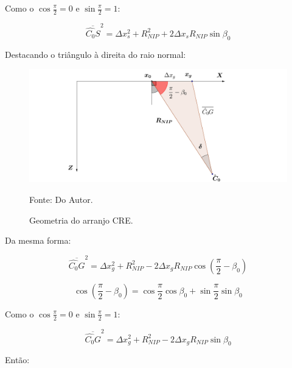 \documentclass[a4paper, 12pt]{article}
\begin{document}
Como o $\cos{\frac{\pi}{2}}=0$ e $\sin{\frac{\pi}{2}}=1$:

\begin{equation}
 \label{eq:1.12}
 \overline{\hat{C_0}S}^2 = \Delta x_{s}^2 + R_{NIP}^2 + 2 \Delta x_s R_{NIP} \sin{\beta_0}
\end{equation}

Destacando o triângulo à direita do raio normal:

\begin{figure}[H]
\caption{Geometria do arranjo CRE.}
\begin{center}
\includegraphics[scale=0.5]{images/Esq.png}
\vspace{-0.3cm}
\end{center}
\begin{center}
 Fonte: Do Autor.
\end{center}
\label{fig:1.5}
\end{figure}

Da mesma forma:

\begin{equation}
 \label{eq:1.13}
 \overline{\hat{C_0}G}^2 = \Delta x_{g}^2 + R_{NIP}^2 - 2 \Delta x_g R_{NIP} 
 \cos{ \left( \frac{\pi}{2} - \beta_0 \right) }
\end{equation}

\begin{equation}
 \label{eq:1.14}
 \cos{\left( \frac{\pi}{2} - \beta_0 \right)} 
 = \cos{\frac{\pi}{2}} \cos{\beta_0} + \sin{\frac{\pi}{2}} \sin{\beta_0}
\end{equation}

Como o $\cos{\frac{\pi}{2}}=0$ e $\sin{\frac{\pi}{2}}=1$:

\begin{equation}
 \label{eq:1.15}
 \overline{\hat{C_0}G}^2 = \Delta x_{g}^2 + R_{NIP}^2 - 2 \Delta x_g R_{NIP} \sin{\beta_0}
\end{equation}

Então:
\end{document}
